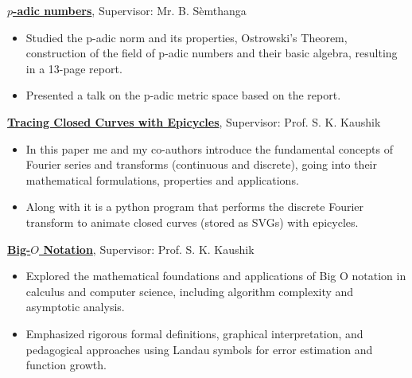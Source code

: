 {}
{\href{https://drive.google.com/file/d/1ccd4o58qntyjndkokzaeszttc6epykrq/view?usp=sharing}
    {\textbf{$p$-adic numbers}}, Supervisor: Mr. B. Sèmthanga}
{
    \begin{itemize}
        \item Studied the p-adic norm and its properties, Ostrowski's Theorem, construction of the field of p-adic numbers and their basic algebra, resulting in a 13-page report.
        \item Presented a talk on the p-adic metric space based on the report.
    \end{itemize}
}

{}
{\href{https://drive.google.com/file/d/11-x1EeIfJQ-dBzBWS3uMN9M7creMVBjU/view?usp=sharing}
    {\textbf{Tracing Closed Curves with Epicycles}}, Supervisor: Prof. S. K. Kaushik}
{
    \begin{itemize}
        \item In this paper me and my co-authors introduce the fundamental concepts of Fourier series and transforms (continuous and discrete), going into their mathematical formulations, properties and applications.
        \item Along with it is a python program that performs the discrete Fourier transform to animate closed curves (stored as SVGs) with epicycles.
    \end{itemize}
}

{}
{\href{https://drive.google.com/file/d/17TYu954BWVxVPbyHTLwTCE6rcR60hcNU/view?usp=sharing}
    {\textbf{Big-$O$ Notation}}, Supervisor: Prof. S. K. Kaushik}
{
    \begin{itemize}
        \item Explored the mathematical foundations and applications of Big O notation in calculus and computer science, including algorithm complexity and asymptotic analysis.
        \item Emphasized rigorous formal definitions, graphical interpretation, and pedagogical approaches using Landau symbols for error estimation and function growth.
    \end{itemize}
}
